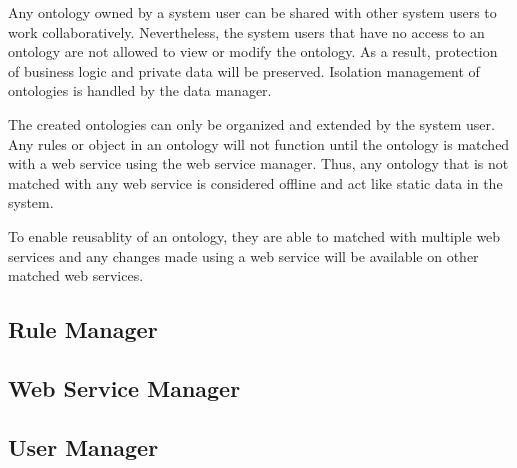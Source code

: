 Any ontology owned by a system user can be shared with other system users to work collaboratively. Nevertheless, the system users that have no access to an ontology are not allowed to view or modify the ontology. As a result, protection of business logic and private data will be preserved. Isolation management of ontologies is handled by the data manager. 

The created ontologies can only be organized and extended by the system user. Any rules or object in an ontology will not function until the ontology is matched with a web service using the web service manager. Thus, any ontology that is not matched with any web service is considered offline and act like static data in the system.

To enable reusablity of an ontology, they are able to matched with multiple web services and any changes made using a web service will be available on other matched web services.


\subsection{Rule Manager}

\subsection{Web Service Manager}

\subsection{User Manager}
